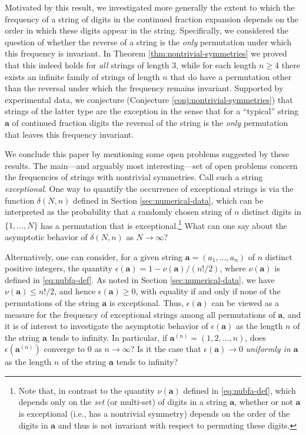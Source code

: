 \documentclass[10pt]{article}
\theoremstyle{definition}
\numberwithin{equation}{section}
\numberwithin{lemma}{section}
\newcommand{\bfa}{\mathbf{a}}
\begin{document}
Motivated by this result, we investigated more generally the extent to
which the frequency of a string of digits in the continued fraction
expansion depends on the order in which these digits appear in the
string. Specifically, we considered the question of whether the reverse of
a string is the \emph{only} permutation  under which this
frequency is invariant.  In Theorem \ref{thm:nontrivial-symmetries} we 
proved that this indeed holds for \emph{all} strings of length $3$,
while for each length $n\ge 4$ there exists an infinite family of
strings of length $n$ that do have a permutation other
than the reversal under which the frequency remains invariant.  
Supported by experimental data, we conjecture (Conjecture
\ref{conj:nontrivial-symmetries}) that strings of the latter type are 
the exception in the sense that for a ``typical'' string $\bfa$ of
continued fraction digits the reversal of the string is the \emph{only}
permutation that leaves this frequency invariant. 

We conclude this paper by mentioning some open problems suggested by
these results. The main---and arguably most interesting---set of open
problems concern the frequencies of strings with nontrivial symmetries.
Call such a string \emph{exceptional}.
One way to quantify the
occurrence of exceptional strings is via the function $\delta(N,n)$
defined in Section \ref{sec:numerical-data}, which can be 
interpreted as the probability that a randomly chosen string of $n$
distinct digits in $\{1,\dots,N\}$ has a permutation that is
exceptional.\footnote{%
Note that, in contrast to the quantity $\nu(\bfa)$ defined in
\eqref{eq:nubfa-def}, which depends 
only on the \emph{set} (or multi-set) of digits 
in a string $\bfa$, 
whether or not $\bfa$ is exceptional (i.e., has
a nontrivial symmetry) depends on the order of the digits in $\bfa$ and
thus is not invariant with respect to permuting these digits.}
What can one say about the asymptotic behavior of
$\delta(N,n)$ as $N\to\infty$?  

Alternatively, one can consider, for a given string
$\bfa=(a_1,\dots,a_n)$ of $n$ distinct positive integers, the quantity
$\epsilon(\bfa)=1-\nu(\bfa)/(n!/2)$, where $\nu(\bfa)$ is defined in
\eqref{eq:nubfa-def}.  As noted in Section \ref{sec:numerical-data}, we
have $\nu(\bfa)\le n!/2$, and hence $\epsilon(\bfa)\ge 0$, with
equality if and only if none of the permutations of the string $\bfa$ is
exceptional.  Thus, $\epsilon(\bfa)$ can be viewed as a measure for the frequency of 
exceptional strings among all permutations of $\bfa$,  
and it is of interest to investigate the asymptotic behavior of
$\epsilon(\bfa)$  as the length $n$ of the string $\bfa$ tends to infinity.
In particular, if $\bfa^{(n)}=(1,2,\dots,n)$, does
$\epsilon(\bfa^{(n)})$ converge to $0$ as $n\to\infty$?  Is it the case
that $\epsilon(\bfa)\to0$ \emph{uniformly in $\bfa$} as the length $n$
of the string $\bfa$ tends to infinity? 
\end{document}
